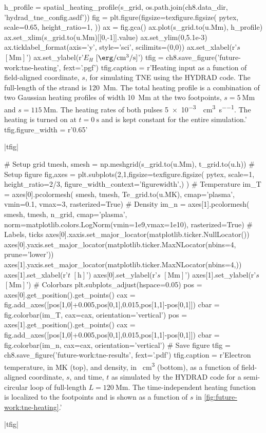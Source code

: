 \begin{pycode}[chapter8]
h_profile = spatial_heating_profile(s_grid, os.path.join(ch8.data_dir, 'hydrad_tne_config.asdf'))
fig = plt.figure(figsize=texfigure.figsize(
    pytex,
    scale=0.65,
    height_ratio=1,
))
ax = fig.gca()
ax.plot(s_grid.to(u.Mm), h_profile)
ax.set_xlim(s_grid.to(u.Mm)[[0,-1]].value)
ax.set_ylim(0,5.1e-3)
ax.ticklabel_format(axis='y', style='sci', scilimits=(0,0))
ax.set_xlabel(r'$s$ $[\si{\mega\m}]$')
ax.set_ylabel(r'$E_H$ $[\si{\erg\per\cubic\cm\per\second}]$')
tfig = ch8.save_figure('future-work:tne-heating', fext='.pgf')
tfig.caption = r'Heating input as a function of field-aligned coordinate, $s$, for simulating TNE using the HYDRAD code. The full-length of the strand is \SI{120}{\mega\m}. The total heating profile is a combination of two Gaussian heating profiles of width \SI{10}{\mega\m} at the two footpoints, $s=\SI{5}{\mega\m}$ and $s=\SI{115}{\mega\m}$. The heating rates of both pulses \SI{5e-3}{\erg\per\cubic\cm\per\second}. The heating is turned on at $t=\SI{0}{\second}$ and is kept constant for the entire simulation.'
tfig.figure_width = r'0.65\textwidth'
\end{pycode}
\py[chapter8]|tfig|

\begin{pycode}[chapter8]
# Setup grid
tmesh, smesh = np.meshgrid(s_grid.to(u.Mm), t_grid.to(u.h))
# Setup figure
fig,axes = plt.subplots(2,1,figsize=texfigure.figsize(
    pytex,
    scale=1,
    height_ratio=2/3,
    figure_width_context='figurewidth',)
)
# Temperature
im_T = axes[0].pcolormesh(
    smesh, tmesh, Te_grid.to(u.MK),
    cmap='plasma',
    vmin=0.1,
    vmax=3,
    rasterized=True)
# Density
im_n = axes[1].pcolormesh(
    smesh, tmesh, n_grid,
    cmap='plasma',
    norm=matplotlib.colors.LogNorm(vmin=1e9,vmax=1e10),
    rasterized=True)
# Labels, ticks
axes[0].xaxis.set_major_locator(matplotlib.ticker.NullLocator())
axes[0].yaxis.set_major_locator(matplotlib.ticker.MaxNLocator(nbins=4, prune='lower'))
axes[1].yaxis.set_major_locator(matplotlib.ticker.MaxNLocator(nbins=4,))
axes[1].set_xlabel(r'$t$ $[\si{\hour}]$')
axes[0].set_ylabel(r'$s$ $[\si{\mega\m}]$')
axes[1].set_ylabel(r'$s$ $[\si{\mega\m}]$')
# Colorbars
plt.subplots_adjust(hspace=0.05)
pos = axes[0].get_position().get_points()
cax = fig.add_axes([pos[1,0]+0.005,pos[0,1],0.015,pos[1,1]-pos[0,1]])
cbar = fig.colorbar(im_T, cax=cax, orientation='vertical')
pos = axes[1].get_position().get_points()
cax = fig.add_axes([pos[1,0]+0.005,pos[0,1],0.015,pos[1,1]-pos[0,1]])
cbar = fig.colorbar(im_n, cax=cax, orientation='vertical')
# Save figure
tfig = ch8.save_figure('future-work:tne-results', fext='.pdf')
tfig.caption = r'Electron temperature, in \si{\mega\kelvin} (top), and density, in \si{\per\cubic\cm} (bottom), as a function of field-aligned coordinate, $s$, and time, $t$ as simulated by the HYDRAD code for a semi-circular loop of full-length $L=\SI{120}{\mega\m}$. The time-independent heating function is localized to the footpoints and is shown as a function of $s$ in \autoref{fig:future-work:tne-heating}.'
\end{pycode}
\py[chapter8]|tfig|
